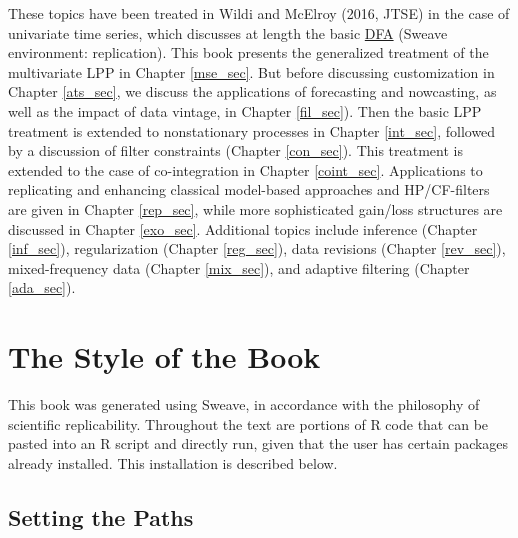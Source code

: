 \documentclass[a4paper]{book}
\begin{document}
These topics have been treated in Wildi and McElroy (2016, JTSE) in the case of univariate time series, which discusses at length
 the basic \href{http://blog.zhaw.ch/sef/files/2014/10/DFA.pdf}{DFA} (Sweave environment: replication).  This book presents
 the generalized treatment of the multivariate LPP in   Chapter \ref{mse_sec}. But before discussing customization in Chapter \ref{ats_sec},
 we discuss the applications of forecasting and nowcasting, as well as the impact of data vintage, in  Chapter \ref{fil_sec}).
 Then the basic LPP treatment is extended to nonstationary processes in Chapter \ref{int_sec}, followed by a discussion of filter constraints (Chapter \ref{con_sec}).
  This treatment is extended to the case of co-integration in Chapter \ref{coint_sec}.   Applications to replicating and enhancing classical model-based approaches and HP/CF-filters 
 are given in Chapter \ref{rep_sec}, while  more sophisticated gain/loss structures  are discussed in Chapter \ref{exo_sec}.
Additional topics include inference (Chapter \ref{inf_sec}), regularization (Chapter \ref{reg_sec}), data revisions (Chapter \ref{rev_sec}),
 mixed-frequency data (Chapter \ref{mix_sec}), and   adaptive filtering (Chapter \ref{ada_sec}).

\section{The Style of the Book}

This book was generated using Sweave, in accordance with the philosophy of 
 scientific replicability.  Throughout the text are portions of R code that
 can be pasted into an R script and directly run, given that the user
 has certain packages already installed.  This installation is described below.
 
\subsection{Setting the Paths}
\end{document}
